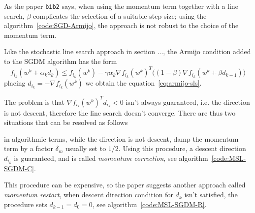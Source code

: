 As the paper \texttt{bib2} says, when using the momentum term together with a line search, $\beta$ complicates the selection of a suitable step-size; using the algorithm~\ref{code:SGD-Armijo}, the approach is not robust to the choice of the momentum term.

Like the stochastic line search approach in section ..., the Armijo condition added to the SGDM algorithm has the form
\begin{equation}\label{eq:armijo-sgdm}
f_{i_k}(w^k+\alpha_kd_k)\leq f_{i_k}(w^k)-\gamma\alpha_k\nabla f_{i_k}(w^k)^T\bigl((1-\beta)\nabla f_{i_k}(w^k+\beta d_{k-1})\bigr)
\end{equation}
placing $d_{i_k}=-\nabla f_{i_k}(w^k)$ we obtain the equation~\eqref{eq:armijo-sls}.

The problem is that $\nabla f_{i_k}(w^k)^Td_{i_k}<0$ isn't always guaranteed, i.e. the direction is not descent, therefore the line search doesn't converge. There are thus two situations that can be resolved as follows
\begin{center}
\end{center}
in algorithmic terms, while the direction is not descent, damp the momentum term by a factor $\delta_m$ usually set to $1/2$. Using this procedure, a descent direction $d_{i_k}$ is guaranteed, and is called \emph{momentum correction}, see algorithm~\vref{code:MSL-SGDM-C}.

This procedure can be expensive, so the paper suggests another approach called \emph{momentum restart}, when descent direction condition for $d_k$ isn't satisfied, the procedure sets $d_{k-1}=d_0=0$, see algorithm~\vref{code:MSL-SGDM-R}.
